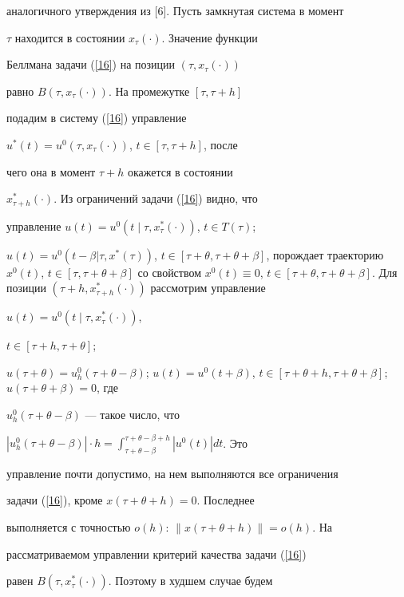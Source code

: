 аналогичного утверждения из [6]. Пусть замкнутая система в момент


$\tau$ находится в состоянии $x_{\tau}(\cdot)$. Значение функции


Беллмана задачи (\ref{16}) на позиции $(\tau, x_{\tau}(\cdot))$


равно $B(\tau, x_{\tau}(\cdot))$. На промежутке $[\tau, \tau+h]$ \tts{[}


подадим в систему (\ref{16}) управление


$u^*(t)=u^0(\tau,x_{\tau}(\cdot))$, $t \in [\tau, \tau+h]$, \tts{[} после


чего она в момент $\tau+h$ окажется в состоянии


$x^*_{\tau+h}(\cdot)$. Из ограничений задачи (\ref{16}) видно, что


управление $u(t)=u^0(t\mid\tau,x_{\tau}^*(\cdot))$, $t \in T(\tau)$;


$u(t)=u^0(t-\beta|\tau,x^*(\tau))$, $t \in [\tau+\theta,


\tau+\theta+\beta]$, \tts{[} порождает траекторию $x^0(t)$, $t \in [\tau,


\tau+\theta+\beta]$ со свойством $x^0(t) \equiv 0$, $t \in


[\tau+\theta, \tau+\theta+\beta]$. Для позиции $(\tau+h,


x_{\tau+h}^*(\cdot))$ рассмотрим управление


$u(t)=u^0(t\mid\tau,x^*_{\tau}(\cdot))$,


$t \in [\tau+h, \tau+\theta]$; \tts{[}


$u(\tau+\theta)=u_h^0(\tau+\theta-\beta)$; $u(t)=u^0(t+\beta)$, $t \in


[\tau+\theta+h, \tau+\theta+\beta]$; \tts{[} $u(\tau+\theta+\beta)=0$, где


$u^0_h(\tau+\theta-\beta)$ --- такое число, что


$|u^0_h(\tau+\theta-\beta)|\cdot h =


\displaystyle\int_{\tau+\theta-\beta}^{\tau+\theta-\beta+h}|u^0(t)|dt$. Это


управление почти допустимо, на нем выполняются все ограничения


задачи (\ref{16}), кроме $x(\tau+\theta+h)=0$. Последнее


выполняется с точностью $o(h)$: $\|x(\tau+\theta+h)\|=o(h)$. На


рассматриваемом управлении критерий качества задачи (\ref{16})


равен $B(\tau,x_{\tau}^*(\cdot))$. Поэтому в худшем случае будем


